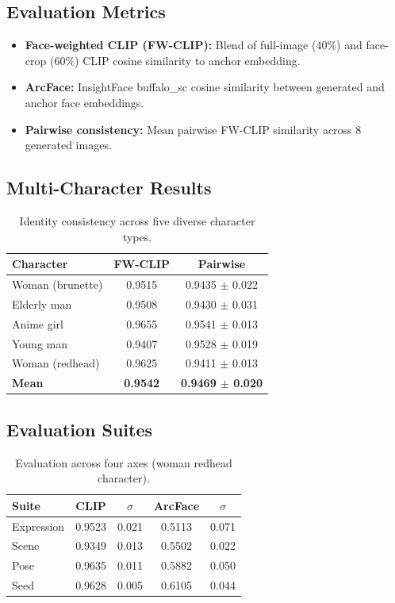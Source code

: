 \documentclass[10pt,twocolumn]{article}
\begin{document}
\subsection{Evaluation Metrics}

\begin{itemize}[leftmargin=*,topsep=2pt,itemsep=1pt]
    \item \textbf{Face-weighted CLIP (FW-CLIP):} Blend of full-image (40\%) and face-crop (60\%) CLIP cosine similarity to anchor embedding.
    \item \textbf{ArcFace:} InsightFace buffalo\_sc cosine similarity between generated and anchor face embeddings.
    \item \textbf{Pairwise consistency:} Mean pairwise FW-CLIP similarity across 8 generated images.
\end{itemize}

\subsection{Multi-Character Results}

\begin{table}[h]
\centering
\caption{Identity consistency across five diverse character types.}
\label{tab:multichar}
\begin{tabular}{lcc}
\toprule
Character & FW-CLIP & Pairwise \\
\midrule
Woman (brunette) & 0.9515 & 0.9435 $\pm$ 0.022 \\
Elderly man & 0.9508 & 0.9430 $\pm$ 0.031 \\
Anime girl & 0.9655 & 0.9541 $\pm$ 0.013 \\
Young man & 0.9407 & 0.9528 $\pm$ 0.019 \\
Woman (redhead) & 0.9625 & 0.9411 $\pm$ 0.013 \\
\midrule
\textbf{Mean} & \textbf{0.9542} & \textbf{0.9469 $\pm$ 0.020} \\
\bottomrule
\end{tabular}
\end{table}

\subsection{Evaluation Suites}

\begin{table}[h]
\centering
\caption{Evaluation across four axes (woman redhead character).}
\label{tab:suites}
\begin{tabular}{lcccc}
\toprule
Suite & CLIP & $\sigma$ & ArcFace & $\sigma$ \\
\midrule
Expression & 0.9523 & 0.021 & 0.5113 & 0.071 \\
Scene & 0.9349 & 0.013 & 0.5502 & 0.022 \\
Pose & 0.9635 & 0.011 & 0.5882 & 0.050 \\
Seed & 0.9628 & 0.005 & 0.6105 & 0.044 \\
\bottomrule
\end{tabular}
\end{table}
\end{document}
